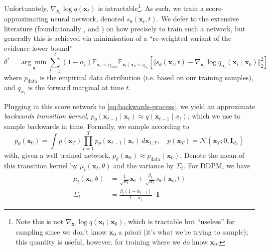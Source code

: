 Unfortunately, $\nabla_{\mathbf{x}_t}\log q(\mathbf{x}_t)$ is intractable\footnote{Note this is not
$\nabla_{\mathbf{x}_t}\log q(\mathbf{x}_t \mid \mathbf{x}_0)$, which is tractable but ``useless''
for sampling since we don't know $\mathbf{x}_0$ a priori (it's what we're trying to sample); this
quantity is useful, however, for training where we \emph{do} know $\mathbf{x}_0$.}.
As such, we train a score-approximating \parencite{songScoreBasedGenerativeModeling2021} neural
network, denoted $s_\theta(\mathbf{x}_t, t)$. We defer to the extensive literature (foundationally
\textcite{hoDenoisingDiffusionProbabilistic2020}, \textcite{songScoreBasedGenerativeModeling2021}
and \textcite{nicholImprovedDenoisingDiffusion2021}) on how precisely to train such a network, but
generally this is achieved via minimisation of a ``re-weighted variant of the evidence lower bound''
\parencite{songScoreBasedGenerativeModeling2021}
\begin{equation*}
    \theta^* = \underset{\theta}{\arg\min}\sum_{t=1}^T (1 - \alpha_t)\mathbb{E}_{\mathbf{x}_0 \sim \hat{p}_{\text{data}}}\mathbb{E}_{\mathbf{x}_t \mid \mathbf{x}_0 \sim q_{\alpha_t}}\left[\Vert s_\theta(\mathbf{x}_t, t) - \nabla_{\mathbf{x}_t}\log q_{\alpha_t}(\mathbf{x}_t \mid \mathbf{x}_0)\Vert_2^2\right]
\end{equation*}
where $\hat{p}_{\text{data}}$ is the empirical data distribution (i.e. based on our training
samples), and $q_{\alpha_t}$ is the forward marginal at time $t$.

Plugging in this score network to \autoref{eq:backwards-process}, we yield an approximate
\emph{backwards transition kernel},
$p_\theta(\mathbf{x}_{t-1} \mid \mathbf{x}_t) \approx q(\mathbf{x}_{t-1} \mid x_t)$, which we use to
sample backwards in time. Formally, we sample according to
\begin{equation}
    p_\theta(\mathbf{x}_0) = \int p(\mathbf{x}_T)\prod_{t=1}^T p_\theta(\mathbf{x}_{t-1} \mid \mathbf{x}_{t})\, d\mathbf{x}_{1:T},\quad p(\mathbf{x}_T) = \mathcal{N}(\mathbf{x}_T; 0, \mathbf{I}_{d_x}) \label{eq:uncond-sampling}
\end{equation}
with, given a well trained network, $p_\theta(\mathbf{x}_0) \approx p_{\text{data}}(\mathbf{x}_0)$.
Denote the mean of this transition kernel by $\mu_t(\mathbf{x}_t, \theta)$ and the variance by
$\Sigma_t$. For DDPM, we have
\begin{align}
    \mu_t(\mathbf{x}_t, \theta) &= \frac{1}{\sqrt{\alpha_t}}\mathbf{x}_{t} + \frac{\beta_t}{\sqrt{\alpha_t}}s_\theta(\mathbf{x}_t, t) \label{eq:ddpm-mu} \\
    \Sigma_t &= \frac{\beta_t(1 - \overline{\alpha}_{t-1})}{1 - \overline{\alpha}_t}\cdot \mathbf{I} \label{eq:ddpm-sigma}
\end{align}

